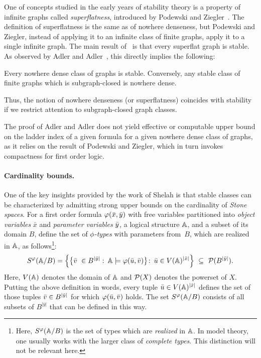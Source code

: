   One of concepts studied in the early 
  years of stability theory is 
  a property of infinite graphs  called \emph{superflatness}, introduced by Podewski and Ziegler~\cite{podewski1978stable}.
  The definition of superflatness is the same as   of nowhere denseness, but 
   Podewski and Ziegler,
  instead of applying it to an infinite class of finite graphs, apply it to a single infinite graph.
  The main result of~\cite{podewski1978stable} is that every superflat graph is stable.   
As observed by Adler and Adler~\cite{adler2014interpreting}, 
this directly implies  the following:
 \begin{theorem}\label{thm:adleradler}
 	Every nowhere dense class of graphs is stable. Conversely, any stable class of finite graphs which is subgraph-closed  is nowhere dense.
 \end{theorem}
 Thus, the notion of nowhere denseness (or superflatness) coincides with stability if we restrict attention to subgraph-closed graph classes.
 
The proof of Adler and Adler does not yield effective or computable upper bound on the 
ladder index of a given formula for a given nowhere dense class of graphs, as it relies on the result of Podewski and Ziegler, which in turn invokes compactness for first order logic.

\paragraph{Cardinality bounds.}
One of the key insights provided by the work of Shelah is that stable classes can be characterized by admitting strong upper bounds on the cardinality of \emph{Stone spaces}.
For a first order formula $\varphi(\bar{x},\bar{y})$ 
with free variables partitioned into \emph{object variables} $\bar x$ and \emph{parameter variables} $\bar{y}$, a logical structure $\mathbb A$,
and a subset of its domain $B$, define
the set of \emph{$\phi$-types} with parameters from~$B$, which are realized in 
$\mathbb{A}$, as follows\footnote{Here, $S^\varphi(\mathbb A/B)$ is the set  of types which are \emph{realized} in $\mathbb A$. In model theory,
one usually works with the larger class of \emph{complete types}. This distinction will not be relevant here.}:
\begin{equation}\label{eq:stone-def}
S^\varphi(\mathbb{A}/B)=\left\{\big\{\bar{v}\ \in B^{|\bar y|}\, \colon\, \mathbb{A}\models\varphi(\bar{u},\bar{v})\big\} \colon\, \bar{u}\in V(\mathbb{A})^{|\bar x|}\right\}\ \subseteq\  \mathcal{P}(B^{|\bar y|}).
\end{equation}
Here, $V(\mathbb{A})$ denotes the domain of $\mathbb{A}$ and $\mathcal{P}(X)$ denotes the powerset of $X$.
Putting the above definition in words, every tuple $\bar{u}\in V(\mathbb{A})^{|\bar x|}$ defines the set of those tuples $\bar{v}\in B^{|\bar y|}$ for which $\varphi(\bar{u},\bar{v})$ holds.
The set $S^\varphi(\mathbb{A}/B)$ consists of all subsets of $B^{|\bar y|}$ that can be defined in this way.

